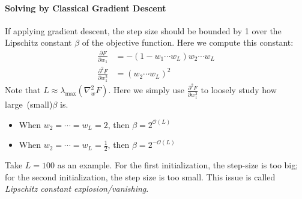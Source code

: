 \paragraph{Solving by Classical Gradient Descent}
If applying gradient descent, the step size should be bounded by 1 over the Lipschitz constant $\beta$ of the objective function. 
Here we compute this constant:
\begin{align*}
\frac{\partial F}{\partial w_1}&=-(1-w_1\cdots w_L)w_2\cdots w_L\\
\frac{\partial^2 F}{\partial w_1^2}&=(w_2\cdots w_L)^2
\end{align*}
Note that $L\approx\lambda_{\max}(\nabla^2_{w}F)$. Here we simply use $\frac{\partial^2 F}{\partial w_1^2}$ to loosely study how large~(small)$\beta$ is.
\begin{itemize}
\item
When $w_2=\cdots=w_L=2$, then $\beta=2^{\mathcal{O}(L)}$
\item
When $w_2=\cdots=w_L=\frac{1}{2}$, then $\beta=2^{-\mathcal{O}(L)}$
\end{itemize}
Take $L=100$ as an example. For the first initialization, the step-size is too big; for the second initialization, the step size is too small.
This issue is called \emph{Lipschitz constant explosion/vanishing}.






